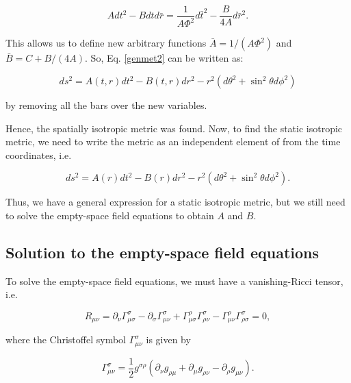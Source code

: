 \documentclass[letterpaper,11pt,onecolumn]{article}
\begin{document}
\begin{equation}
A d t^{2}-B d t d \bar{r}=\frac{1}{A \Phi^{2}} d \bar{t}^{2}-\frac{B}{4 A} d \bar{r}^{2}. \nonumber
\end{equation}

This allows us to define new arbitrary functions $\bar{A}=1 /\left(A \Phi^{2}\right)$ and $\bar{B}=C+B /(4 A)$. So, Eq. \ref{genmet2} can be written as:

\begin{equation}
d s^{2}=A(t, r) d t^{2}-B(t, r) d r^{2}-r^{2}\left(d \theta^{2}+\sin ^{2} \theta d \phi^{2}\right) \nonumber
\end{equation}

by removing all the bars over the new variables.

Hence, the spatially isotropic metric was found. Now, to find the static isotropic metric, we need to write the metric as an independent element of from the time coordinates, i.e. 

\begin{equation}
d s^{2}=A( r) d t^{2}-B( r) d r^{2}-r^{2}\left(d \theta^{2}+\sin ^{2} \theta d \phi^{2}\right). \nonumber
\end{equation}

Thus, we have a general expression for a static isotropic metric, but we still need to solve the empty-space field equations to obtain $A$ and $B$.
\subsection{Solution to the empty-space field equations}

To solve the empty-space field equations, we must have a vanishing-Ricci tensor, i.e.

\begin{equation}
        R_{\mu \nu}=\partial_{\nu} \Gamma_{\mu \sigma}^{\sigma}-\partial_{\sigma} \Gamma_{\mu \nu}^{\sigma}+\Gamma_{\mu \sigma}^{\rho} \Gamma_{\rho \nu}^{\sigma}-\Gamma_{\mu \nu}^{\rho} \Gamma_{\rho \sigma}^{\sigma}=0
        \label{ricci},
\end{equation}

where the Christoffel symbol $\Gamma_{\mu \nu}^{\sigma}$ is given by 
 
\begin{equation}
\Gamma_{\mu \nu}^{\sigma}=\frac{1}{2} g^{\sigma \rho}\left(\partial_{\nu} g_{\rho \mu}+\partial_{\mu} g_{\rho \nu}-\partial_{\rho} g_{\mu \nu}\right)
\label{conn}.
\end{equation}
\end{document}
